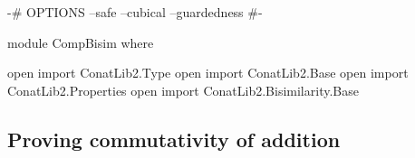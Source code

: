 \begin{code}[hide]
{-# OPTIONS --safe --cubical --guardedness #-}

module CompBisim where

open import ConatLib2.Type
open import ConatLib2.Base
open import ConatLib2.Properties
open import ConatLib2.Bisimilarity.Base
\end{code}



\subsection{Proving commutativity of addition}


